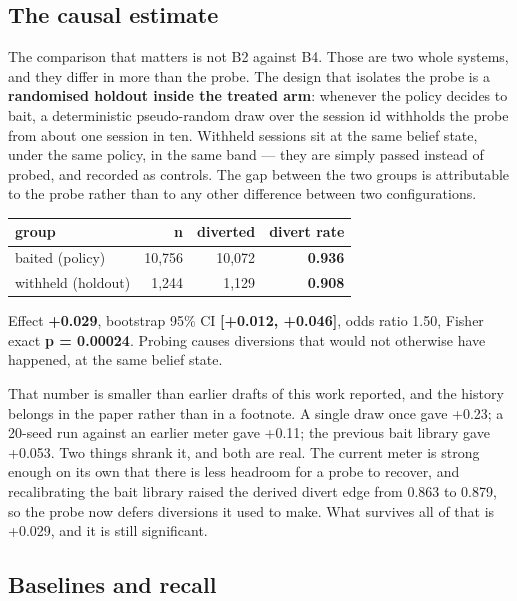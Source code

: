 \subsection{The causal estimate}

The comparison that matters is not B2 against B4. Those are two whole systems, and
they differ in more than the probe. The design that isolates the probe is a
\textbf{randomised holdout inside the treated arm}: whenever the policy decides to bait,
a deterministic pseudo-random draw over the session id withholds the probe from
about one session in ten. Withheld sessions
sit at the same belief state, under the same policy, in the same band --- they are
simply passed instead of probed, and recorded as controls. The gap between the two
groups is attributable to the probe rather than to any other difference between two
configurations.

\begin{table}[t]
\centering
\small
\begin{tabular}{lrrr}
\toprule
group & n & diverted & divert rate \\
\midrule
baited (policy) & 10,756 & 10,072 & \textbf{0.936} \\
withheld (holdout) & 1,244 & 1,129 & \textbf{0.908} \\
\bottomrule
\end{tabular}
\end{table}


Effect \textbf{+0.029}, bootstrap 95\% CI \textbf{[+0.012, +0.046]}, odds ratio 1.50, Fisher
exact \textbf{p = 0.00024}. Probing causes diversions that would not otherwise have
happened, at the same belief state.

That number is smaller than earlier drafts of this work reported, and the history
belongs in the paper rather than in a footnote. A single draw once gave +0.23; a
20-seed run against an earlier meter gave +0.11; the previous bait library gave
+0.053. Two things shrank it, and both are real. The current meter is strong enough
on its own that there is less headroom for a probe to recover, and recalibrating the
bait library raised the derived divert edge from 0.863 to 0.879, so the probe now
defers diversions it used to make. What survives all of that is +0.029, and it is
still significant.


\subsection{Baselines and recall}

